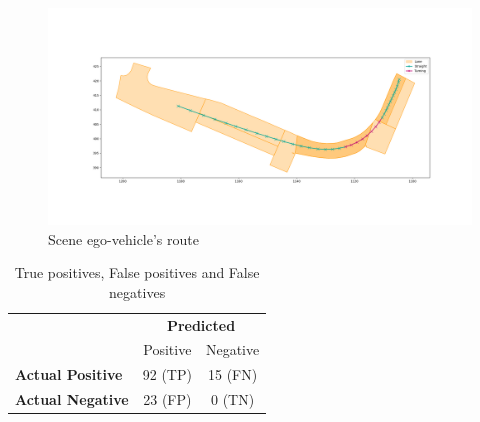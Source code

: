 \begin{figure}[h!]
    \centering
    \includegraphics[width=\linewidth]{./images/experiments/ground_truth_turning_5deg.png}
    \caption{Scene ego-vehicle's route}
    \label{fig:scene_ego_path}
\end{figure}

\begin{table}[h!]
    \centering
    \begin{tabular}{|l|c|c|}
    \hline
    \multicolumn{1}{|c|}{} & \multicolumn{2}{c|}{\textbf{Predicted}} \\
    \cline{2-3}
     & Positive & Negative \\
    \hline
    \textbf{Actual Positive} & 92 (TP) & 15 (FN) \\
    \hline
    \textbf{Actual Negative} & 23 (FP) & 0 (TN) \\
    \hline
    \end{tabular}
    \caption{True positives, False positives and False negatives}
    \label{tab:scene_confusion_matrix}
\end{table}

